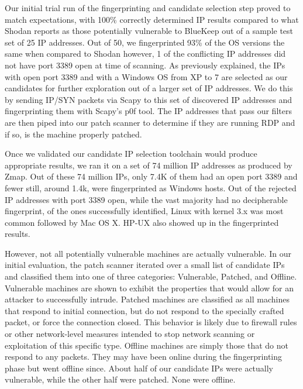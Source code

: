 Our initial trial run of the fingerprinting and candidate selection step proved to match expectations, with 100\% correctly determined IP results compared to what Shodan reports as those potentially vulnerable to BlueKeep out of a sample test set of 25 IP addresses. Out of 50, we fingerprinted 93\% of the OS versions the same when compared to Shodan however, 1 of the conflicting IP addresses did not have port 3389 open at time of scanning. As previously explained, the IPs with open port 3389 and with a Windows OS from XP to 7 are selected as our candidates for further exploration out of a larger set of IP addresses. We do this by sending IP/SYN packets via Scapy to this set of discovered IP addresses and fingerprinting them with Scapy's p0f tool. The IP addresses that pass our filters are then piped into our patch scanner to determine if they are running RDP and if so, is the machine properly patched.

Once we validated our candidate IP selection toolchain would produce appropriate results, we ran it on a set of 74 million IP addresses as produced by Zmap. Out of these 74 million IPs, only 7.4K of them had an open port 3389 and fewer still, around 1.4k, were fingerprinted as Windows hosts. Out of the rejected IP addresses with port 3389 open, while the vast majority had no decipherable fingerprint, of the ones successfully identified, Linux  with kernel 3.x was most common followed by Mac OS X. HP-UX also showed up in the fingerprinted results.

However, not all potentially vulnerable machines are actually vulnerable. In our initial evaluation, the patch scanner iterated over a small list of candidate IPs and classified them into one of three categories: Vulnerable, Patched, and Offline. Vulnerable machines are shown to exhibit the properties that would allow for an attacker to successfully intrude. Patched machines are classified as all machines that respond to initial connection, but do not respond to the specially crafted packet, or force the connection closed. This behavior is likely due to firewall rules or other network-level measures intended to stop network scanning or exploitation of this specific type. Offline machines are simply those that do not respond to any packets. They may have been online during the fingerprinting phase but went offline since. About half of our candidate IPs were actually vulnerable, while the other half were patched. None were offline.

